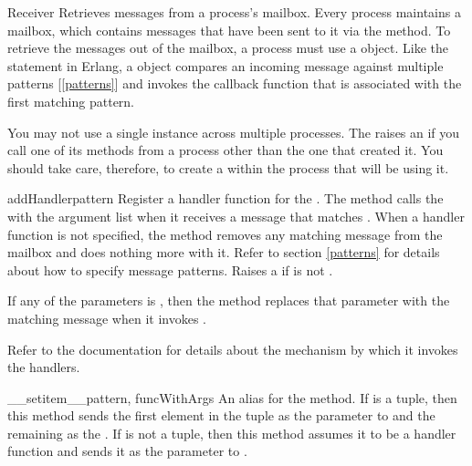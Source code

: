 \documentclass{howto}
\begin{document}
\begin{classdesc}{Receiver}{}
Retrieves messages from a process's mailbox. Every process maintains a mailbox,
which contains messages that have been sent to it via the 
method. To retrieve the messages out of the mailbox, a process must use a
 object. Like the  statement in Erlang, a
 object compares an incoming message against multiple patterns
[\ref{patterns}] and invokes the callback function that is associated
with the first matching pattern.

\begin{notice}[warning]
You may not use a single  instance across multiple processes.
The  raises an  if you call one
of its methods from a process other than the one that created it. You should
take care, therefore, to create a  within the process that will
be using it.
\end{notice}

\begin{methoddesc}{addHandler}{pattern}
Register a handler function  for the . The
 method calls the  with the  argument
list when it receives a message that matches . When a handler
function  is not specified, the  method removes any
matching message from the mailbox and does nothing more with it. Refer to
section \ref{patterns} for details about how to specify message patterns. Raises
a   if  is not
.

If any of the  parameters is , then the
 method replaces that parameter with the matching message when
it invokes .

Refer to the  documentation for details about the
mechanism by which it invokes the handlers.
\end{methoddesc}

\begin{methoddesc}{__setitem__}{pattern, funcWithArgs}
\opindex{[]}
An alias for the  method. If  is a tuple,
then this method sends the first element in the tuple as the 
parameter to  and the remaining as the . If
 is not a tuple, then this method assumes it to be a handler
function and sends it as the  parameter to .


\end{methoddesc}
\end{classdesc}
\end{document}
